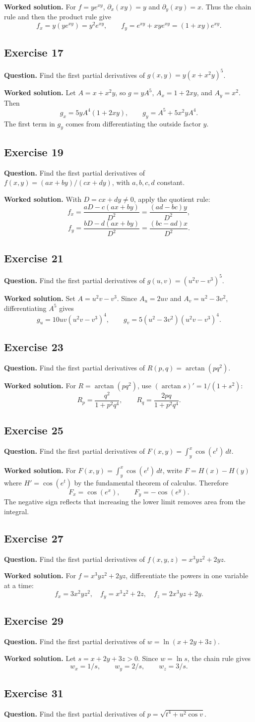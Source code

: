 \documentclass[11pt]{article}
\newcommand{\ex}[1]{\Needspace{8\baselineskip}\subsection*{Exercise #1}}
\newcommand{\ans}[1]{\boxed{#1}}
\begin{document}
\textbf{Worked solution.}
For $f=ye^{xy}$, $\partial_x(xy)=y$ and $\partial_y(xy)=x$. Thus the chain rule and then the product rule give
\[\ans{f_x=y(y e^{xy})=y^2e^{xy}},\qquad\ans{f_y=e^{xy}+xy e^{xy}=(1+xy)e^{xy}}.\]
\ex{17}
\textbf{Question.} Find the first partial derivatives of $g(x,y)=y(x+x^2y)^5$.

\textbf{Worked solution.}
Let $A=x+x^2y$, so $g=yA^5$, $A_x=1+2xy$, and $A_y=x^2$. Then
\[\ans{g_x=5yA^4(1+2xy)},\qquad\ans{g_y=A^5+5x^2yA^4}.\]
The first term in $g_y$ comes from differentiating the outside factor $y$.
\ex{19}
\textbf{Question.} Find the first partial derivatives of $f(x,y)=(ax+by)/(cx+dy)$, with $a,b,c,d$ constant.

\textbf{Worked solution.}
With $D=cx+dy\ne0$, apply the quotient rule:
\[f_x=\frac{aD-c(ax+by)}{D^2}=\ans{\frac{(ad-bc)y}{D^2}},\]
\[f_y=\frac{bD-d(ax+by)}{D^2}=\ans{\frac{(bc-ad)x}{D^2}}.\]
\ex{21}
\textbf{Question.} Find the first partial derivatives of $g(u,v)=(u^2v-v^3)^5$.

\textbf{Worked solution.}
Set $A=u^2v-v^3$. Since $A_u=2uv$ and $A_v=u^2-3v^2$, differentiating $A^5$ gives
\[\ans{g_u=10uv(u^2v-v^3)^4},\qquad\ans{g_v=5(u^2-3v^2)(u^2v-v^3)^4}.\]
\ex{23}
\textbf{Question.} Find the first partial derivatives of $R(p,q)=\arctan(pq^2)$.

\textbf{Worked solution.}
For $R=\arctan(pq^2)$, use $(\arctan s)'=1/(1+s^2)$:
\[\ans{R_p=\frac{q^2}{1+p^2q^4}},\qquad\ans{R_q=\frac{2pq}{1+p^2q^4}}.\]
\ex{25}
\textbf{Question.} Find the first partial derivatives of $F(x,y)=\int_y^x\cos(e^t)\,dt$.

\textbf{Worked solution.}
For $F(x,y)=\int_y^x\cos(e^t)\,dt$, write $F=H(x)-H(y)$ where $H'=\cos(e^t)$ by the fundamental theorem of calculus. Therefore
\[\ans{F_x=\cos(e^x)},\qquad\ans{F_y=-\cos(e^y)}.\]
The negative sign reflects that increasing the lower limit removes area from the integral.
\ex{27}
\textbf{Question.} Find the first partial derivatives of $f(x,y,z)=x^3yz^2+2yz$.

\textbf{Worked solution.}
For $f=x^3yz^2+2yz$, differentiate the powers in one variable at a time:
\[\ans{f_x=3x^2yz^2},\quad\ans{f_y=x^3z^2+2z},\quad\ans{f_z=2x^3yz+2y}.\]
\ex{29}
\textbf{Question.} Find the first partial derivatives of $w=\ln(x+2y+3z)$.

\textbf{Worked solution.}
Let $s=x+2y+3z>0$. Since $w=\ln s$, the chain rule gives
\[\ans{w_x=1/s},\qquad\ans{w_y=2/s},\qquad\ans{w_z=3/s}.\]
\ex{31}
\textbf{Question.} Find the first partial derivatives of $p=\sqrt{t^4+u^2\cos v}$.
\end{document}
